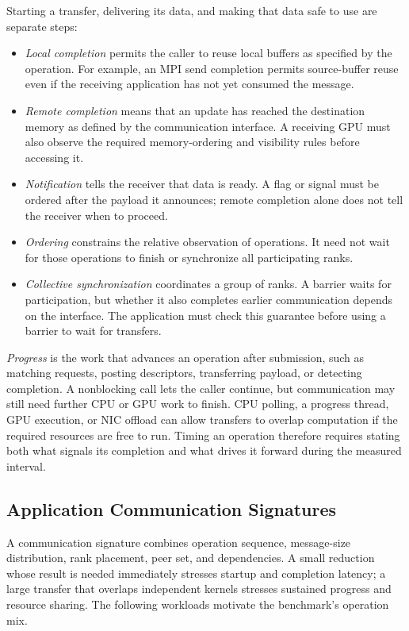 Starting a transfer, delivering its data, and making that data safe to use are separate steps:
\begin{itemize}
\item \emph{Local completion} permits the caller to reuse local buffers as specified by the operation. For example, an MPI send completion permits source-buffer reuse even if the receiving application has not yet consumed the message.
\item \emph{Remote completion} means that an update has reached the destination memory as defined by the communication interface. A receiving GPU must also observe the required memory-ordering and visibility rules before accessing it.
\item \emph{Notification} tells the receiver that data is ready. A flag or signal must be ordered after the payload it announces; remote completion alone does not tell the receiver when to proceed.
\item \emph{Ordering} constrains the relative observation of operations. It need not wait for those operations to finish or synchronize all participating ranks.
\item \emph{Collective synchronization} coordinates a group of ranks. A barrier waits for participation, but whether it also completes earlier communication depends on the interface. The application must check this guarantee before using a barrier to wait for transfers.
\end{itemize}

\emph{Progress} is the work that advances an operation after submission, such as matching requests, posting descriptors, transferring payload, or detecting completion. A nonblocking call lets the caller continue, but communication may still need further CPU or GPU work to finish. CPU polling, a progress thread, GPU execution, or NIC offload can allow transfers to overlap computation if the required resources are free to run. Timing an operation therefore requires stating both what signals its completion and what drives it forward during the measured interval.

\subsection{Application Communication Signatures}\label{sec:workload-patterns}

A communication signature combines operation sequence, message-size distribution, rank placement, peer set, and dependencies. A small reduction whose result is needed immediately stresses startup and completion latency; a large transfer that overlaps independent kernels stresses sustained progress and resource sharing. The following workloads motivate the benchmark's operation mix.

